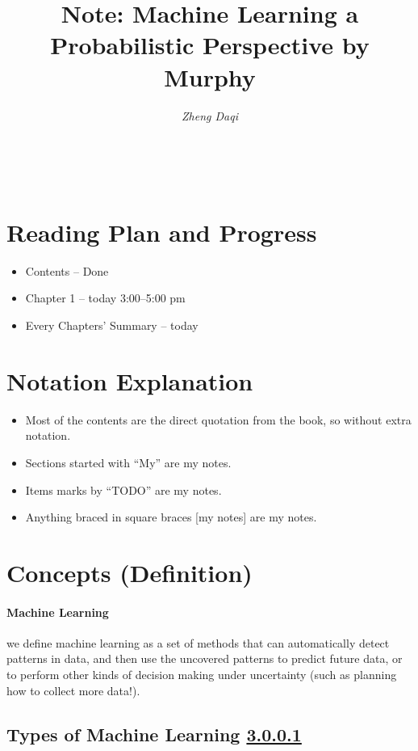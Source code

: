 \documentclass[11pt,a4paper]{article}
\title{Note: Machine Learning a Probabilistic Perspective \cite{murphy:2012:Book:MLaPP} by Murphy }
\author{\textit{Zheng Daqi}}
\begin{document}
\maketitle

\\

\section{Reading Plan and Progress}
\begin{itemize}
 \item Contents -- Done
 \item Chapter 1 -- today 3:00--5:00 pm
 \item Every Chapters' Summary -- today
\end{itemize}

\section{Notation Explanation}
\begin{itemize}
 \item Most of the contents are the direct quotation from the book, so without extra notation.
 \item Sections started with ``My'' are my notes.
 \item Items marks by ``TODO'' are my notes.
 \item Anything braced in square braces [my notes] are my notes.
\end{itemize}


\section{Concepts (Definition)}
\paragraph{Machine Learning}\label{Definition:Machine Learning}
we define machine learning as a set of methods that can
automatically detect patterns in data, and then use the uncovered patterns to predict future
data, or to perform other kinds of decision making under uncertainty (such as planning how to
collect more data!).

\subsection{Types of Machine Learning \ref{Definition:Machine Learning}}
\end{document}
